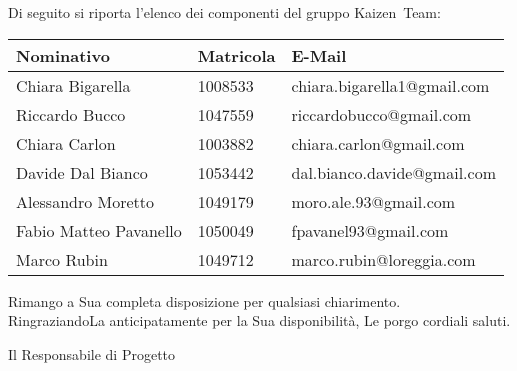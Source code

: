 \documentclass{letter}
\begin{document}
\begin{letter}{}
	Di seguito si riporta l'elenco dei componenti del gruppo Kaizen~Team:
	\begin{center}
		\begin{tabu}[c]{|p{4cm}|p{2.5cm}|p{5cm}|}
		\hline
			\rowfont{\bf}
			\textbf{Nominativo} & \textbf{Matricola} & \textbf{E-Mail} \\ \hline
			Chiara Bigarella & 1008533 & chiara.bigarella1@gmail.com \\ \hline
			Riccardo Bucco & 1047559 & riccardobucco@gmail.com \\ \hline
			Chiara Carlon & 1003882 & chiara.carlon@gmail.com \\ \hline
			Davide Dal Bianco & 1053442 & dal.bianco.davide@gmail.com \\ \hline
			Alessandro Moretto & 1049179 & moro.ale.93@gmail.com \\ \hline
			Fabio Matteo Pavanello & 1050049 & fpavanel93@gmail.com \\ \hline
			Marco Rubin & 1049712 & marco.rubin@loreggia.com \\ \hline
		\end{tabu}
	\end{center}

	Rimango a Sua completa disposizione per qualsiasi chiarimento.\\
	RingraziandoLa anticipatamente per la Sua disponibilità, Le porgo cordiali saluti.
	
	\closing{
		Il Responsabile di Progetto \\ [1cm]
		 \\
	}

\end{letter}
\end{document}
